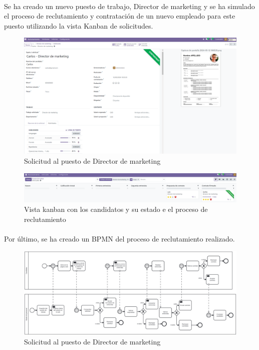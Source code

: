 \paragraph{}
Se ha creado un nuevo puesto de trabajo, Director de marketing y se ha simulado el proceso de reclutamiento y contratación de un nuevo empleado para este puesto utilizando la vista Kanban de solicitudes.
\begin{figure}[h]
    \centering
    \includegraphics[width=1\linewidth]{fotosGestPers/reclutamiento.png}
    \caption{Solicitud al puesto de Director de marketing}
    \label{fig:enter-label}
\end{figure}
\begin{figure}[h]
    \centering
    \includegraphics[width=1\linewidth]{fotosGestPers/kanban.png}
    \caption{Vista kanban con los candidatos y su estado e el proceso de reclutamiento}
    \label{fig:enter-label}
\end{figure}
\paragraph{}
Por último, se ha creado un BPMN del proceso de reclutamiento realizado.
\begin{figure}[h]
    \centering
    \includegraphics[width=1\linewidth]{bpmn/gestPers.png}
    \caption{Solicitud al puesto de Director de marketing}
    \label{fig:enter-label}
\end{figure}
\newpage
